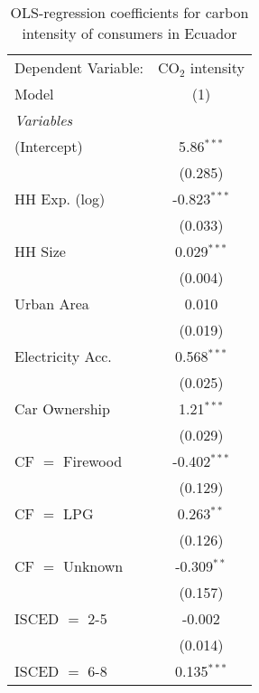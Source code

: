 
\begin{table}[htbp!]
   \centering
   \small
   \begin{adjustbox}{width = 1\textwidth, max height = 0.95\textheight, center}
      \begin{threeparttable}[b]
         \caption{\label{tab:OLS_1_ECU} OLS-regression coefficients for carbon intensity of consumers in Ecuador}
         \begin{tabular}{lc}
            \tabularnewline \midrule \midrule
            Dependent Variable: & CO$_{2}$ intensity\\  
            Model               & (1)\\  
            \midrule
            \emph{Variables}\\
            (Intercept)         & 5.86$^{***}$\\   
                                & (0.285)\\   
            HH Exp. (log)       & -0.823$^{***}$\\   
                                & (0.033)\\   
            HH Size             & 0.029$^{***}$\\   
                                & (0.004)\\   
            Urban Area          & 0.010\\   
                                & (0.019)\\   
            Electricity Acc.    & 0.568$^{***}$\\   
                                & (0.025)\\   
            Car Ownership       & 1.21$^{***}$\\   
                                & (0.029)\\   
            CF $=$ Firewood     & -0.402$^{***}$\\   
                                & (0.129)\\   
            CF $=$ LPG          & 0.263$^{**}$\\   
                                & (0.126)\\   
            CF $=$ Unknown      & -0.309$^{**}$\\   
                                & (0.157)\\   
            ISCED $=$ 2-5       & -0.002\\   
                                & (0.014)\\   
            ISCED $=$ 6-8       & 0.135$^{***}$\\   

\end{tabular}
\end{threeparttable}
\end{adjustbox}
\end{table}
